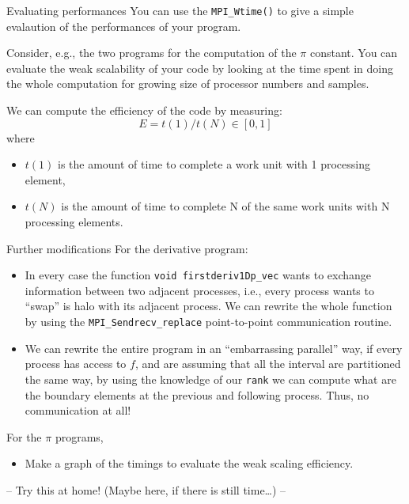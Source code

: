 \documentclass[xcolor={svgnames,usenames}]{beamer}
\begin{document}
\begin{frame}{Evaluating performances}
You can use the \texttt{MPI_Wtime()} to give a simple \alert{evalaution of the performances} of your program.
\medskip

Consider, e.g., the two programs for the computation of the $\pi$ constant. You can evaluate the \alert{weak scalability} of your code by looking at the time spent in doing the whole computation for growing size of processor numbers and samples. 
\medskip

We can compute the \alert{efficiency} of the code by measuring:
\begin{equation*}
	E = t(1)/t(N) \in [0,1]
\end{equation*}
where
\begin{itemize}
	\item $t(1)$ is the amount of time to complete a work unit with 1 processing element,
	\item $t(N)$ is the amount of time to complete N of the same work units with N processing elements.
\end{itemize}
\end{frame}

\begin{frame}{Further modifications}
For the derivative program:
\begin{itemize}
\item In every case the function \texttt{void firstderiv1Dp_vec} wants to exchange
information between two adjacent processes, i.e., every process wants to ``swap'' is halo with its adjacent process. We can rewrite the whole function by using the \texttt{MPI_Sendrecv_replace} point-to-point communication routine.
\item We can rewrite the entire program in an ``embarrassing parallel'' way, if every process has access to $f$, and are assuming that all the interval are partitioned the same way, by using the knowledge of our \texttt{rank} we can compute what are the boundary elements at the previous and following process. Thus, no communication at all!
\end{itemize}
For the $\pi$ programs, 
\begin{itemize}
	\item Make a graph of the timings to evaluate the \alert{weak scaling} efficiency.
\end{itemize}
\vfill
\begin{center} 
-- Try this at home! (Maybe here, if there is still time\ldots) --
\end{center}
\end{frame}
\end{document}
